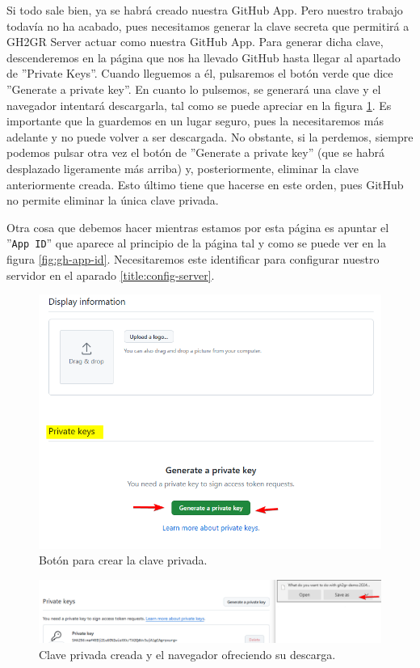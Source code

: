 Si todo sale bien, ya se habrá creado nuestra GitHub App. Pero nuestro trabajo todavía no ha acabado, pues necesitamos generar la clave secreta que permitirá a GH2GR Server actuar como nuestra GitHub App. Para generar dicha clave, descenderemos en la página que nos ha llevado GitHub hasta llegar al apartado de ''Private Keys''. Cuando lleguemos a él, pulsaremos el botón verde que dice ''Generate a private key''. En cuanto lo pulsemos, se generará una clave y el navegador intentará descargarla, tal como se puede apreciar en la figura \ref{fig:download-secret-key}. Es importante que la guardemos en un lugar seguro, pues la necesitaremos más adelante y no puede volver a ser descargada. No obstante, si la perdemos, siempre podemos pulsar otra vez el botón de ''Generate a private key'' (que se habrá desplazado ligeramente más arriba) y, posteriormente, eliminar la clave anteriormente creada. Esto último tiene que hacerse en este orden, pues GitHub no permite eliminar la única clave privada.

Otra cosa que debemos hacer mientras estamos por esta página es apuntar el ''{\tt App ID}'' que aparece al principio de la página tal y como se puede ver en la figura \ref{fig:gh-app-id}. Necesitaremos este identificar para configurar nuestro servidor en el aparado \ref{title:config-server}.

\begin{figure}
    \centering
    \includegraphics[width=0.5\linewidth]{images/generate-secret-key-.png}
    \caption{Botón para crear la clave privada.}
\end{figure}

\begin{figure}
    \centering
    \includegraphics[width=0.5\linewidth]{images/generate-secret-key-download.png}
    \caption{Clave privada creada y el navegador ofreciendo su descarga.}
    \label{fig:download-secret-key}
\end{figure}

